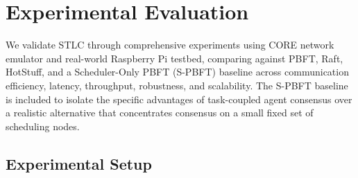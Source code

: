 \documentclass[manuscript,screen,review]{acmart}
\begin{document}
\begin{table}[h]
\centering
\caption{STLC vs.\ Traditional PBFT}
\label{tab:pbft_comparison}
\small
{}
\end{table}
\section{Experimental Evaluation}
\label{sec:evaluation}
\label{sec:experiments}

We validate STLC through comprehensive experiments using CORE network emulator and real-world Raspberry Pi testbed, comparing against PBFT, Raft, HotStuff, and a Scheduler-Only PBFT (S-PBFT) baseline across communication efficiency, latency, throughput, robustness, and scalability. The S-PBFT baseline is included to isolate the specific advantages of task-coupled agent consensus over a realistic alternative that concentrates consensus on a small fixed set of scheduling nodes.

\subsection{Experimental Setup}
\label{sec:exp_setup}
\end{document}
